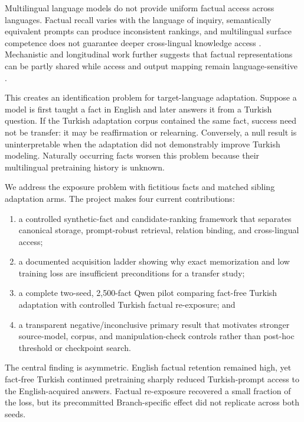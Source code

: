 \documentclass[10pt,a4paper,twocolumn]{article}
\begin{document}
Multilingual language models do not provide uniform factual access across languages. Factual recall varies with the language of inquiry, semantically equivalent prompts can produce inconsistent rankings, and multilingual surface competence does not guarantee deeper cross-lingual knowledge access \citep{schott2023polyglot,qi2023crosslingual,chua2025barriers,aggarwal2025inquiry}. Mechanistic and longitudinal work further suggests that factual representations can be partly shared while access and output mapping remain language-sensitive \citep{zhao2024roots,wang2025lost,liu2025acquisition}.

This creates an identification problem for target-language adaptation. Suppose a model is first taught a fact in English and later answers it from a Turkish question. If the Turkish adaptation corpus contained the same fact, success need not be transfer: it may be reaffirmation or relearning. Conversely, a null result is uninterpretable when the adaptation did not demonstrably improve Turkish modeling. Naturally occurring facts worsen this problem because their multilingual pretraining history is unknown.

We address the exposure problem with fictitious facts and matched sibling adaptation arms. The project makes four current contributions:

\begin{enumerate}
  \item a controlled synthetic-fact and candidate-ranking framework that separates canonical storage, prompt-robust retrieval, relation binding, and cross-lingual access;
  \item a documented acquisition ladder showing why exact memorization and low training loss are insufficient preconditions for a transfer study;
  \item a complete two-seed, 2,500-fact Qwen pilot comparing fact-free Turkish adaptation with controlled Turkish factual re-exposure; and
  \item a transparent negative/inconclusive primary result that motivates stronger source-model, corpus, and manipulation-check controls rather than post-hoc threshold or checkpoint search.
\end{enumerate}

The central finding is asymmetric. English factual retention remained high, yet fact-free Turkish continued pretraining sharply reduced Turkish-prompt access to the English-acquired answers. Factual re-exposure recovered a small fraction of the loss, but its precommitted Branch-specific effect did not replicate across both seeds.
\end{document}

